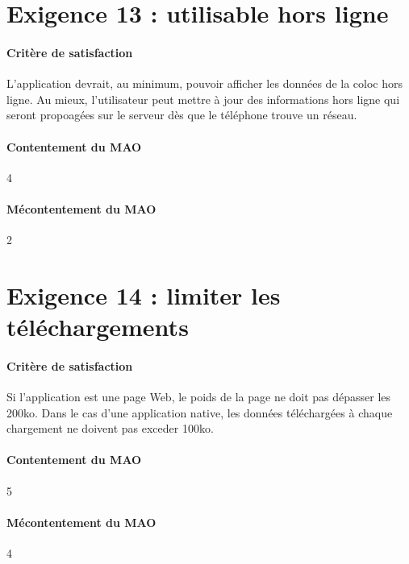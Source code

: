 \documentclass[a4paper, 12pt, french, landscape]{article}
\begin{document}
    \section{Exigence 13 : utilisable hors ligne}

    \paragraph{Critère de satisfaction}
    L'application devrait, au minimum, pouvoir afficher les données de la coloc hors ligne. Au mieux, l'utilisateur peut mettre à jour des informations hors ligne qui seront propoagées sur le serveur dès que le téléphone trouve un réseau.

    \paragraph{Contentement du MAO}
    4

    \paragraph{Mécontentement du MAO}
    2

    \section{Exigence 14 : limiter les téléchargements}

    \paragraph{Critère de satisfaction}
    Si l'application est une page Web, le poids de la page ne doit pas dépasser les 200ko. Dans le cas d'une application native, les données téléchargées à chaque chargement ne doivent pas exceder 100ko.

    \paragraph{Contentement du MAO}
    5

    \paragraph{Mécontentement du MAO}
    4
\end{document}
